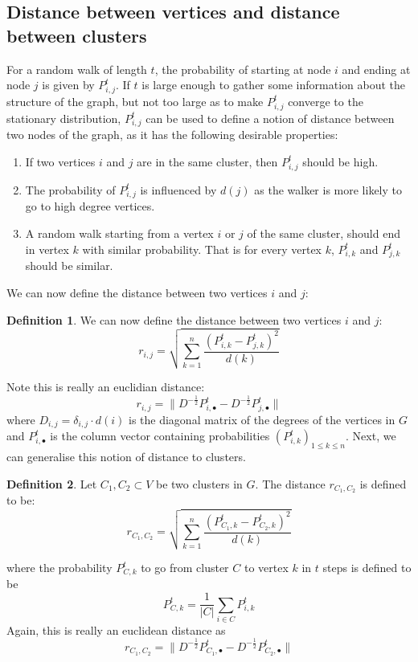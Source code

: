 \documentclass[12pt]{article}
\theoremstyle{definition}
\newtheorem{definition}{Definition}
\begin{document}
\subsection{Distance between vertices and distance between clusters}
For a random walk of length $t$, the probability of starting at node $i$ and ending at node $j$ is given by $P_{i,j}^t$. If $t$ is large enough to gather some information about the structure of the graph, but not too large as to make $P_{i,j}^t$ converge to the stationary distribution, $P_{i,j}^t$ can be used to define a notion of distance between two nodes of the graph, as it has the following desirable properties:
\begin{enumerate}
	\item If two vertices $i$ and $j$ are in the same cluster, then $P_{i,j}^t$ should be high.
	\item The probability of $P_{i,j}^t$ is influenced by $d(j)$ as the walker is more likely to go to high degree vertices.
	\item A random walk starting from a vertex $i$ or $j$ of the same cluster, should end in vertex $k$ with similar probability. That is for every vertex $k$, $P_{i,k}^t$  and $P_{j,k}^t$ should be similar.
\end{enumerate}
We can now define the distance between two vertices $i$ and $j$:
\begin{definition}
	We can now define the distance between two vertices $i$ and $j$:
	\[ r_{i,j} = \sqrt{\sum_{k=1}^n \frac{(P_{i,k}^t - P_{j,k}^t)^2}{d(k)}} \]
\end{definition}
Note this is really an euclidian distance:
\[ r_{i,j} = \|D^{-\frac{1}{2}}P_{i,\bullet}^t - D^{-\frac{1}{2}}P_{j,\bullet}^t \|\]
where $D_{i,j} = \delta_{i,j} \cdot d(i)$ is the diagonal matrix of the degrees of the vertices in $G$ and $P_{i,\bullet}^t$ is the column vector containing probabilities $(P_{i,k}^t)_{1 \le k \le n}$.
Next, we can generalise this notion of distance to clusters.
\begin{definition}
	Let $C_1, C_2 \subset V$ be two clusters in $G$. The distance $r_{C_1,C_2}$ is defined to be:
	\[ r_{C_1,C_2} = \sqrt{\sum_{k=1}^n \frac{(P_{C_1,k}^t - P_{C_2,k}^t)^2}{d(k)}} \]
\end{definition}
where the probability $P_{C,k}^t$ to go from cluster $C$ to vertex $k$ in $t$ steps is defined to be
\[ P_{C,k}^t = \frac{1}{|C|}\sum_{i \in C}P_{i,k}^t\]
Again, this is really an euclidean distance as 
\[  r_{C_1,C_2} = \|D^{-\frac{1}{2}}P_{C_1,\bullet}^t - D^{-\frac{1}{2}}P_{C_2,\bullet}^t \|\]
\end{document}

